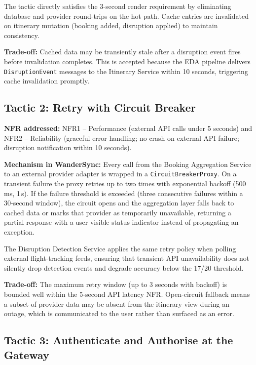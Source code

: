\documentclass[12pt,a4paper]{article}
\begin{document}
The tactic directly satisfies the 3-second render requirement by eliminating database and
provider round-trips on the hot path. Cache entries are invalidated on itinerary mutation (booking
added, disruption applied) to maintain consistency.

\textbf{Trade-off:} Cached data may be transiently stale after a disruption event fires before
invalidation completes. This is accepted because the EDA pipeline delivers \texttt{DisruptionEvent}
messages to the Itinerary Service within 10 seconds, triggering cache invalidation promptly.

\subsection{Tactic 2: Retry with Circuit Breaker}

\textbf{NFR addressed:} NFR1 -- Performance (external API calls under 5 seconds) and NFR2 --
Reliability (graceful error handling; no crash on external API failure; disruption notification
within 10 seconds).

\textbf{Mechanism in WanderSync:}
Every call from the Booking Aggregation Service to an external provider adapter is wrapped in a
\texttt{CircuitBreakerProxy}. On a transient failure the proxy retries up to two times with
exponential backoff (500\,ms, 1\,s). If the failure threshold is exceeded (three consecutive
failures within a 30-second window), the circuit opens and the aggregation layer falls back to
cached data or marks that provider as temporarily unavailable, returning a partial response with
a user-visible status indicator instead of propagating an exception.

The Disruption Detection Service applies the same retry policy when polling external
flight-tracking feeds, ensuring that transient API unavailability does not silently drop detection
events and degrade accuracy below the 17/20 threshold.

\textbf{Trade-off:} The maximum retry window (up to 3 seconds with backoff) is bounded well within
the 5-second API latency NFR. Open-circuit fallback means a subset of provider data may be absent
from the itinerary view during an outage, which is communicated to the user rather than surfaced
as an error.

\subsection{Tactic 3: Authenticate and Authorise at the Gateway}
\end{document}

